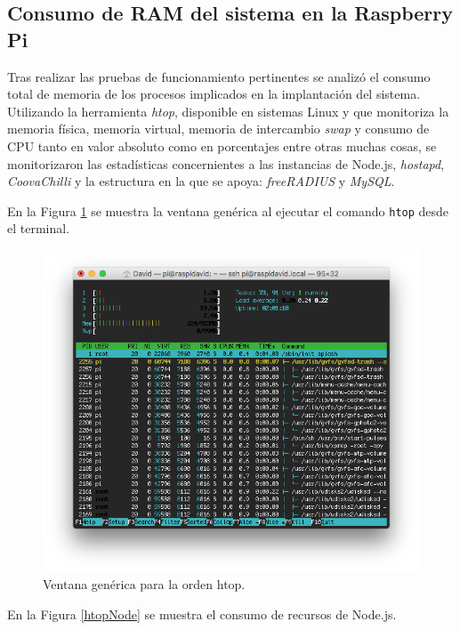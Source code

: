 \subsection{Consumo de RAM del sistema en la Raspberry Pi}

Tras realizar las pruebas de funcionamiento pertinentes se analizó el consumo total de memoria de los procesos implicados en la implantación del sistema. Utilizando la herramienta \emph{htop}, disponible en sistemas Linux y que monitoriza la memoria física, memoria virtual, memoria de intercambio \emph{swap} y consumo de CPU tanto en valor absoluto como en porcentajes entre otras muchas cosas, se monitorizaron las estadísticas concernientes a las instancias de Node.js, \emph{hostapd}, \emph{CoovaChilli} y la estructura en la que se apoya: \emph{freeRADIUS} y \emph{MySQL}.

En la Figura \ref{htopGeneric} se muestra la ventana genérica al ejecutar el comando \verb+htop+ desde el terminal.

\begin{figure}[!t]
\begin{center}
\includegraphics[width=0.75\linewidth]{./6_EvalEmpirica/Img/htopGeneric.png}
\end{center}
\caption{Ventana genérica para la orden htop.}
\label{htopGeneric}
\end{figure}

En la Figura \ref{htopNode} se muestra el consumo de recursos de Node.js.

